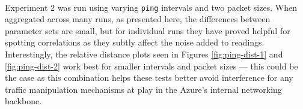 \documentclass[a4paper,10pt]{article}
\begin{document}
\paragraph{} Experiment 2 was run using varying \texttt{ping} intervals and two packet sizes. When aggregated across many runs, as presented here, the differences between parameter sets are small, but for individual runs they have proved helpful for spotting correlations as they subtly affect the noise added to readings. Interestingly, the relative distance plots seen in Figures \ref{fig:ping-dist-1} and \ref{fig:ping-dist-2} work best for smaller intervals and packet sizes --- this could be the case as this combination helps these tests better avoid interference for any traffic manipulation mechanisms at play in the Azure's internal networking backbone. 


\end{document}
